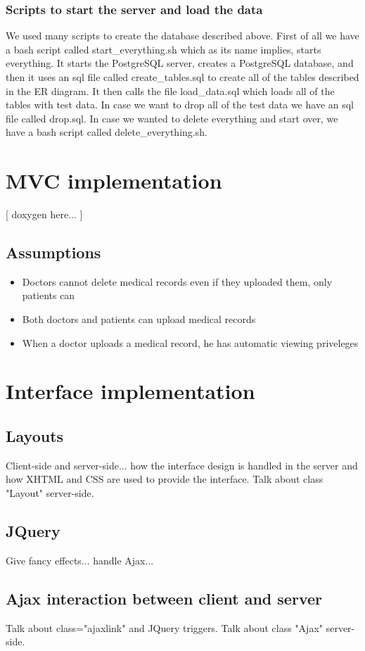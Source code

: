 \documentclass[12pt]{report}
\begin{document}
\subsubsection{Scripts to start the server and load the data}
We used many scripts to create the database described above.  First of all we have a bash script called start\_everything.sh which as its name implies, starts everything.  It starts the PostgreSQL server, creates a PostgreSQL database, and then it uses an sql file called create\_tables.sql to create all of the tables described in the ER diagram.  It then calls the file load\_data.sql which loads all of the tables with test data.  In case we want to drop all of the test data we have an sql file called drop.sql.  In case we wanted to delete everything and start over, we have a bash script called delete\_everything.sh. 

\section{MVC implementation}
[ doxygen here... ]

\subsection{Assumptions}
\begin{itemize}
\item Doctors cannot delete medical records even if they uploaded them, only patients can
\item Both doctors and patients can upload medical records
\item When a doctor uploads a medical record, he has automatic viewing priveleges
\end{itemize}

\section{Interface implementation}
\subsection{Layouts}
Client-side and server-side... how the interface design is handled in the server and how XHTML and CSS are used to provide the interface. Talk about class "Layout" server-side.
\subsection{JQuery}
Give fancy effects... handle Ajax... 
\subsection{Ajax interaction between client and server}
Talk about class="ajaxlink" and JQuery triggers. Talk about class "Ajax" server-side.
\end{document}
